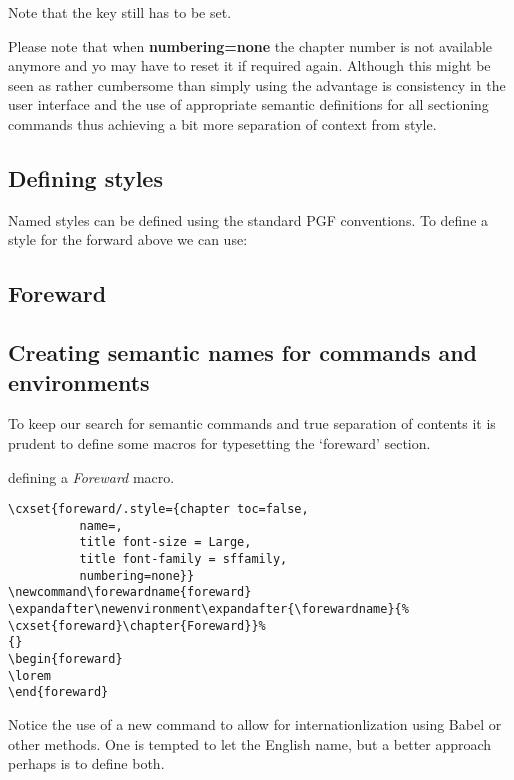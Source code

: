 Note that the key  still has to be set.


Please note that when \textbf{numbering=none} the chapter number is not available anymore and yo may have to reset it if required again. Although this might be seen as rather cumbersome than simply using  the advantage is consistency in the user interface and the use of appropriate semantic definitions for all sectioning commands thus achieving a bit more separation of context from style.



\section{Defining styles}

Named styles can be defined using the standard \textsc{PGF} conventions. To define a style for the forward above we can use:

\begin{texexample}{}{}
\chapter{Foreward}
\lorem
\end{texexample}



\section{Creating semantic names for commands and environments}

To keep our search for semantic commands and true separation of contents it is prudent to define some macros for typesetting the  `foreward' section.

\begin{texexample}{defining a \textit{Foreward} macro.}{}
\begin{lstlisting}
\cxset{foreward/.style={chapter toc=false,
          name=,
          title font-size = Large,
          title font-family = sffamily,
          numbering=none}}
\newcommand\forewardname{foreward}
\expandafter\newenvironment\expandafter{\forewardname}{%
\cxset{foreward}\chapter{Foreward}}%
{}
\begin{foreward}
\lorem
\end{foreward}
\end{lstlisting}
\end{texexample}



Notice the use of a new command  to allow for internationlization using Babel or other methods. One is tempted to let the English name, but a better approach perhaps is to define both.


